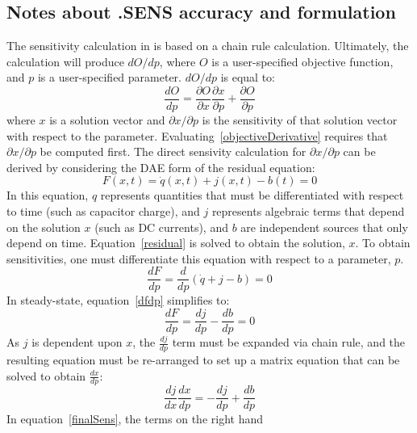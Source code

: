 \clearpage
\subsection{Notes about .SENS accuracy and formulation}
The sensitivity calculation in \Xyce{} is based on a chain rule
calculation.  Ultimately, the calculation will produce $dO/dp$, where
$O$ is a user-specified objective function, and $p$ is a
user-specified parameter.  $dO/dp$ is equal to:
\begin{equation}
  \frac{dO}{dp} = \frac{\partial O}{\partial x}\frac{\partial x}{\partial p} + \frac{\partial O}{\partial p}
  \label{objectiveDerivative}
\end{equation}
\noindent where $x$ is a solution vector and $\partial x/\partial p$
is the sensitivity of that solution vector with respect to the
parameter.  Evaluating~\ref{objectiveDerivative} requires that
$\partial x/\partial p$ be computed first.  The direct sensivity
calculation for $\partial x/\partial p$ can be derived by considering
the DAE form of the residual equation:
\begin{equation}
  F(x,t) = \dot{q}(x,t) + j(x,t) - b(t) = 0
  \label{residual}
\end{equation}
\noindent In this equation, $q$ represents quantities that must be
differentiated with respect to time (such as capacitor charge), and
$j$ represents algebraic terms that depend on the solution $x$ (such
as DC currents), and $b$ are independent sources that only depend on
time.  Equation~\ref{residual} is solved to obtain the solution, $x$.
To obtain sensitivities, one must differentiate this equation with
respect to a parameter, $p$.
\begin{equation}
  \frac{dF}{dp} = \frac{d}{dp}\left( \dot{q} + j - b \right) = 0
  \label{dfdp}
\end{equation}
In steady-state, equation~\ref{dfdp} simplifies to:
\begin{equation}
  \frac{dF}{dp} = \frac{dj}{dp} - \frac{db}{dp} = 0
  \label{steady_dfdp}
\end{equation}
\noindent As $j$ is dependent upon $x$, the $\frac{dj}{dp}$ term must
be expanded via chain rule, and the resulting equation must be
re-arranged to set up a matrix equation that can be solved to obtain
$\frac{dx}{dp}$:
\begin{equation}
  \frac{dj}{dx}\frac{dx}{dp} = - \frac{dj}{dp} + \frac{db}{dp} 
  \label{finalSens}
\end{equation}
\noindent In equation~\ref{finalSens}, the terms on the right hand
